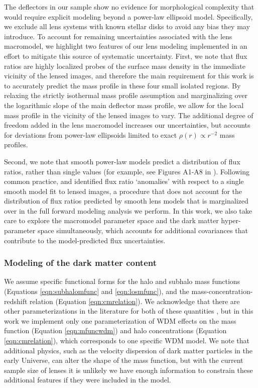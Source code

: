 The deflectors in our sample show no evidence for morphological complexity that would require explicit modeling beyond a power-law ellipsoid model. Specifically, we exclude all lens systems with known stellar disks to avoid any bias they may introduce. To account for remaining uncertainties associated with the lens macromodel, we highlight two features of our lens modeling implemented in an effort to mitigate this source of systematic uncertainty. First, we note that flux ratios are highly localized probes of the surface mass density in the immediate vicinity of the lensed images, and therefore the main requirement for this work is to accurately predict the mass profile in these four small isolated regions. By relaxing the strictly isothermal mass profile assumption and marginalizing over the logarithmic slope of the main deflector mass profile, we allow for the local mass profile in the vicinity of the lensed images to vary. The additional degree of freedom added in the lens macromodel increases our uncertainties, but accounts for deviations from power-law ellipsoids limited to exact $\rho \left(r\right) \propto r^{-2}$ mass profiles. 

Second, we note that smooth power-law models predict a distribution of flux ratios, rather than single values (for example, see Figures A1-A8 in \citet{Nierenberg++19}). Following common practice, \citet{Gilman++17} and \citet{Hsueh++18} identified flux ratio `anomalies' with respect to a single smooth model fit to lensed images, a procedure that does not account for the distribution of flux ratios predicted by smooth lens models that is marginalized over in the full forward modeling analysis we perform. In this work, we also take care to explore the macromodel parameter space and the dark matter hyper-parameter space simultaneously, which accounts for additional covariances that contribute to the model-predicted flux uncertainties. 

\subsubsection{Modeling of the dark matter content}
We assume specific functional forms for the halo and subhalo mass functions (Equations \ref{eqn:subhalomfunc} and \ref{eqn:losmfunc}), and the mass-concentration-redshift relation (Equation \ref{eqn:cmrelation}). We acknowledge that there are other parameterizations in the literature for both of these quantities \citep[e.g.][]{Schneider++12,Benson++13}, but in this work we implement only one parameterization of WDM effects on the mass function (Equation \ref{eqn:mfuncwdm}) and halo concentrations (Equation  \ref{eqn:cmrelation}), which corresponds to one specific WDM model. We note that additional physics, such as the velocity dispersion of dark matter particles in the early Universe, can alter the shape of the mass function, but with the current sample size of lenses it is unlikely we have enough information to constrain these additional features if they were included in the model. 

